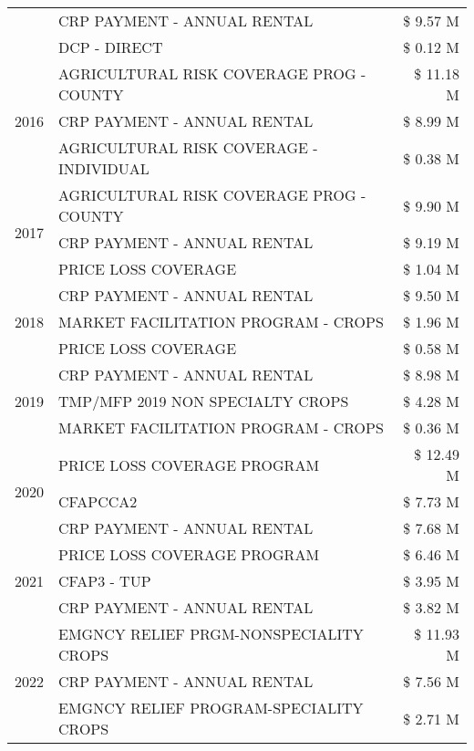 \begin{tabular}{llr}
 & CRP PAYMENT - ANNUAL RENTAL & \$ 9.57 M \\
 & DCP - DIRECT & \$ 0.12 M \\
\cline{1-3}
\multirow[t]{3}{*}{2016} & AGRICULTURAL RISK COVERAGE PROG - COUNTY & \$ 11.18 M \\
 & CRP PAYMENT - ANNUAL RENTAL & \$ 8.99 M \\
 & AGRICULTURAL RISK COVERAGE - INDIVIDUAL & \$ 0.38 M \\
\cline{1-3}
\multirow[t]{3}{*}{2017} & AGRICULTURAL RISK COVERAGE PROG - COUNTY & \$ 9.90 M \\
 & CRP PAYMENT - ANNUAL RENTAL & \$ 9.19 M \\
 & PRICE LOSS COVERAGE & \$ 1.04 M \\
\cline{1-3}
\multirow[t]{3}{*}{2018} & CRP PAYMENT - ANNUAL RENTAL & \$ 9.50 M \\
 & MARKET FACILITATION PROGRAM - CROPS & \$ 1.96 M \\
 & PRICE LOSS COVERAGE & \$ 0.58 M \\
\cline{1-3}
\multirow[t]{3}{*}{2019} & CRP PAYMENT - ANNUAL RENTAL & \$ 8.98 M \\
 & TMP/MFP 2019 NON SPECIALTY CROPS & \$ 4.28 M \\
 & MARKET FACILITATION PROGRAM - CROPS & \$ 0.36 M \\
\cline{1-3}
\multirow[t]{3}{*}{2020} & PRICE LOSS COVERAGE PROGRAM & \$ 12.49 M \\
 & CFAPCCA2 & \$ 7.73 M \\
 & CRP PAYMENT - ANNUAL RENTAL & \$ 7.68 M \\
\cline{1-3}
\multirow[t]{3}{*}{2021} & PRICE LOSS COVERAGE PROGRAM & \$ 6.46 M \\
 & CFAP3 - TUP & \$ 3.95 M \\
 & CRP PAYMENT - ANNUAL RENTAL & \$ 3.82 M \\
\cline{1-3}
\multirow[t]{3}{*}{2022} & EMGNCY RELIEF PRGM-NONSPECIALITY CROPS & \$ 11.93 M \\
 & CRP PAYMENT - ANNUAL RENTAL & \$ 7.56 M \\
 & EMGNCY RELIEF PROGRAM-SPECIALITY CROPS & \$ 2.71 M \\
\cline{1-3}
\bottomrule
\end{tabular}
